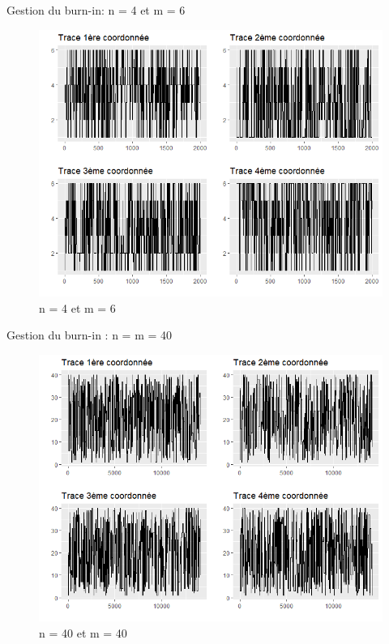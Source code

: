 \documentclass[10pt,xcolor=table,color={dvipsnames,usenames},ignorenonframetext,usepdftitle=false,french]{beamer}
\begin{document}
\begin{frame}{Gestion du burn-in: n = 4 et m = 6}
\protect\hypertarget{gestion-du-burn-in-n-4-et-m-6}{}

\begin{figure}
\includegraphics[width=9.83in]{img/n_4_m_6} \caption{n = 4 et m = 6}\label{fig:unnamed-chunk-1}
\end{figure}

\end{frame}

\begin{frame}{Gestion du burn-in : n = m = 40}
\protect\hypertarget{gestion-du-burn-in-n-m-40}{}

\begin{figure}
\includegraphics[width=9.83in]{img/n_40_m_40} \caption{n = 40 et m = 40}\label{fig:unnamed-chunk-2}
\end{figure}

\end{frame}
\end{document}
